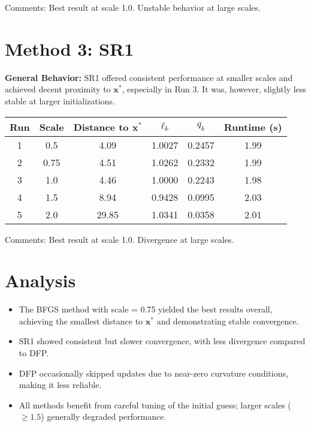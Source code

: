 \documentclass{article}
\begin{document}
\vspace{0.5em}
Comments: Best result at scale 1.0. Unstable behavior at large scales.

\section*{Method 3: SR1}
\textbf{General Behavior:} SR1 offered consistent performance at smaller scales and achieved decent proximity to $\mathbf{x}^*$, especially in Run 3. It was, however, slightly less stable at larger initializations.

\begin{tabular}{cccccc}
\toprule
Run & Scale & Distance to $\mathbf{x}^*$ & $\ell_k$ & $q_k$ & Runtime (s) \\
\midrule
1 & 0.5  & 4.09  & 1.0027 & 0.2457 & 1.99 \\
2 & 0.75 & 4.51  & 1.0262 & 0.2332 & 1.99 \\
3 & 1.0  & 4.46  & 1.0000 & 0.2243 & 1.98 \\
4 & 1.5  & 8.94  & 0.9428 & 0.0995 & 2.03 \\
5 & 2.0  & 29.85 & 1.0341 & 0.0358 & 2.01 \\
\bottomrule
\end{tabular}

\vspace{0.5em}
Comments: Best result at scale 1.0. Divergence at large scales.

\section*{Analysis}
\begin{itemize}
  \item The BFGS method with scale = 0.75 yielded the best results overall, achieving the smallest distance to $\mathbf{x}^*$ and demonstrating stable convergence.
  \item SR1 showed consistent but slower convergence, with less divergence compared to DFP.
  \item DFP occasionally skipped updates due to near-zero curvature conditions, making it less reliable.
  \item All methods benefit from careful tuning of the initial guess; larger scales ($\geq 1.5$) generally degraded performance.
\end{itemize}
\end{document}
